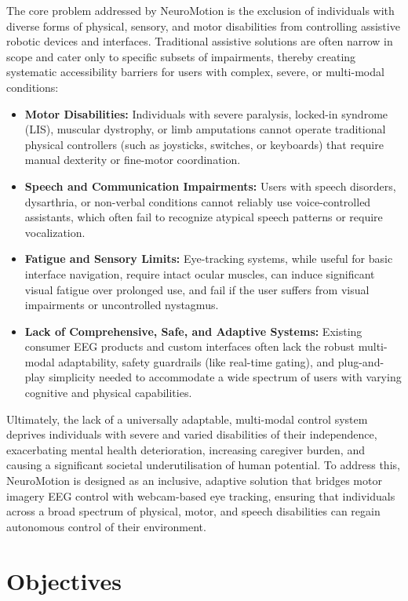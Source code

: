 \documentclass[12pt, a4paper, oneside]{report}
\begin{document}
The core problem addressed by NeuroMotion is the exclusion of individuals with diverse forms of physical, sensory, and motor disabilities from controlling assistive robotic devices and interfaces. Traditional assistive solutions are often narrow in scope and cater only to specific subsets of impairments, thereby creating systematic accessibility barriers for users with complex, severe, or multi-modal conditions:

\begin{itemize}
    \item \textbf{Motor Disabilities:} Individuals with severe paralysis, locked-in syndrome (LIS), muscular dystrophy, or limb amputations cannot operate traditional physical controllers (such as joysticks, switches, or keyboards) that require manual dexterity or fine-motor coordination.
    \item \textbf{Speech and Communication Impairments:} Users with speech disorders, dysarthria, or non-verbal conditions cannot reliably use voice-controlled assistants, which often fail to recognize atypical speech patterns or require vocalization.
    \item \textbf{Fatigue and Sensory Limits:} Eye-tracking systems, while useful for basic interface navigation, require intact ocular muscles, can induce significant visual fatigue over prolonged use, and fail if the user suffers from visual impairments or uncontrolled nystagmus.
    \item \textbf{Lack of Comprehensive, Safe, and Adaptive Systems:} Existing consumer EEG products and custom interfaces often lack the robust multi-modal adaptability, safety guardrails (like real-time gating), and plug-and-play simplicity needed to accommodate a wide spectrum of users with varying cognitive and physical capabilities.
\end{itemize}

Ultimately, the lack of a universally adaptable, multi-modal control system deprives individuals with severe and varied disabilities of their independence, exacerbating mental health deterioration, increasing caregiver burden, and causing a significant societal underutilisation of human potential. To address this, NeuroMotion is designed as an inclusive, adaptive solution that bridges motor imagery EEG control with webcam-based eye tracking, ensuring that individuals across a broad spectrum of physical, motor, and speech disabilities can regain autonomous control of their environment.

\section{Objectives}
\end{document}
